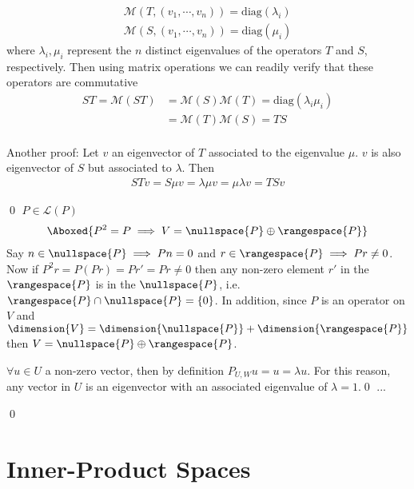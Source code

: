 \begin{align*}
\mathcal{M}(T,(v_1, \cdots, v_n)) = \mathrm{diag}(\lambda_i) \\
\mathcal{M}(S,(v_1, \cdots, v_n)) = \mathrm{diag}(\mu_i)
\end{align*}
where $\lambda_i,\mu_i$ represent the $n$ distinct eigenvalues of the operators $T$ and $S$, respectively.
Then using matrix operations we can readily verify that these operators are commutative
\begin{align*}
ST = \mathcal{M}(ST) &= \mathcal{M}(S)\mathcal{M}(T) = \mathrm{diag}(\lambda_i\mu_i)\\
    &= \mathcal{M}(T)\mathcal{M}(S) = TS
\end{align*}
\\
Another proof: Let $v$ an eigenvector of $T$ associated to the eigenvalue $\mu$. $v$ is also eigenvector of $S$ but associated to $\lambda$. Then 
\begin{align*}
STv = S\mu v = \lambda \mu v = \mu\lambda v = TSv
\end{align*}


\qed
\exo{\label{exo:5_21}} $P\in\mathcal{L}(P)$
\begin{align*}\Aboxed{
P^2 = P \implies V = \nullspace{P}\oplus\rangespace{P} }
\end{align*}
Say $n\in\nullspace{P}\implies Pn=0$ and $r\in\rangespace{P} \implies Pr \neq 0$. Now if $P^2r = P(Pr)= Pr' = Pr \neq 0$ then any non-zero element $r'$ in the $\rangespace{P}$ is in the $\nullspace{P}$, i.e. $\rangespace{P}\cap\nullspace{P}=\{0\}$.
In addition, since $P$ is an operator on $V$ and $\dimension{V} = \dimension{\nullspace{P}} + \dimension{\rangespace{P}}$ then $V = \nullspace{P}\oplus\rangespace{P}$.

\exo{} $\forall u\in U$ a non-zero vector, then by definition $P_{U,W}u = u=\lambda u$. For this reason, any vector in $U$ is an eigenvector with an associated eigenvalue of $\lambda=1$.\qed
\exo{}  ...
\exo{} 

\qed 

\newpage
\section{Inner-Product Spaces}
